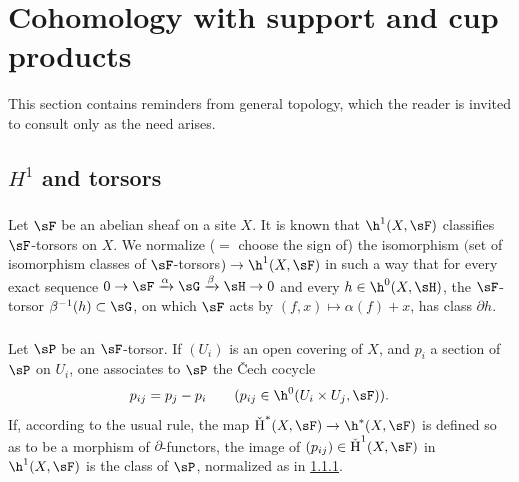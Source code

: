 \section{Cohomology with support and cup products}\label{IV:1}

This section contains reminders from general topology, which the reader is
invited to consult only as the need arises.










\subsection{\texorpdfstring{$H^1$}{H1} and torsors}\label{IV:1-1}






\subsubsection{}\label{IV:1-1-1}

Let $\sF$ be an abelian sheaf on a site $X$. It is known that
$\h^1(X,\sF)$ classifies $\sF$-torsors on $X$. We normalize ($=$ choose the
sign of) the isomorphism $($set of isomorphism classes of
$\sF$-torsors$)\to \h^1(X,\sF)$ in such a way that for every exact sequence
$0\to \sF\xrightarrow\alpha\sG\xrightarrow\beta\sH\to 0$ and every
$h\in\h^0(X,\sH)$, the $\sF$-torsor $\beta^{-1}(h)\subset \sG$, on which
$\sF$ acts by $(f,x)\mapsto \alpha(f)+x$, has class $\partial h$.






\subsubsection{}\label{IV:1-1-2}

Let $\sP$ be an $\sF$-torsor. If $(U_i)$ is an open covering of $X$, and
$p_i$ a section of $\sP$ on $U_i$, one associates to $\sP$ the \v{C}ech
cocycle
\[
  p_{i j} = p_j - p_i \qquad \text{($p_{i j}\in \h^0(U_i\times U_j,\sF)$).}
\]
If, according to the usual rule, the map
$\operatorname{\check H}^*(X,\sF)\to \h^*(X,\sF)$ is defined so
as to be a morphism of $\partial$-functors, the image of
$(p_{i j})\in \operatorname{\check H}^1(X,\sF)$ in $\h^1(X,\sF)$ is the class
of $\sP$, normalized as in \ref{IV:1-1-1}.






